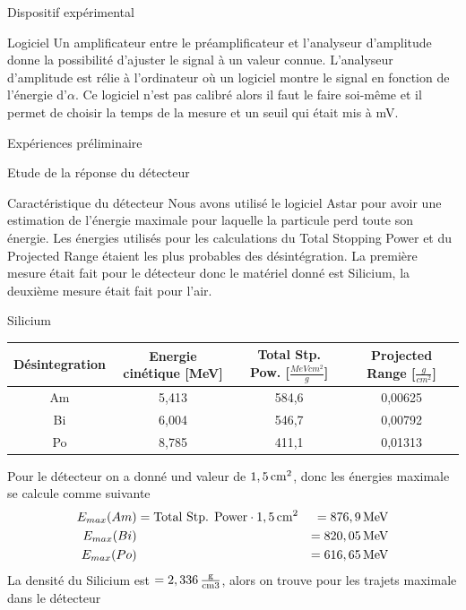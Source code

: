 \documentclass[a4paper,11pt]{scrartcl}
\begin{document}
\begin{section}{Dispositif expérimental}
  \begin{subsection}{Logiciel}
   Un amplificateur entre le préamplificateur et l'analyseur d'amplitude donne la possibilité d'ajuster le signal à un valeur connue. L'analyseur d'amplitude est rélie à l'ordinateur où un logiciel montre le signal en fonction de l'énergie d'$\alpha$. Ce logiciel n'est pas calibré alors il faut le faire soi-même et il permet de choisir la temps de la mesure et un seuil qui était mis à \unit[200]{mV}.
  \end{subsection}
 \end{section}
  
 \begin{section}{Expériences préliminaire}
  \begin{subsection}{Etude de la réponse du détecteur}
   \begin{subsubsection}{Caractéristique du détecteur}
   Nous avons utilisé le logiciel \flqq Astar \frqq \. \cite{astar} pour avoir une estimation de l'énergie maximale pour laquelle la particule perd toute son énergie.  Les énergies utilisés pour les calculations du Total Stopping Power et du Projected Range étaient les plus probables des désintégration. La première mesure était fait pour le détecteur donc le matériel donné est Silicium, la deuxième mesure était fait pour l'air.
   \begin{paragraph}{Silicium}
    \begin{center}
     \begin{tabular}{c|c|c|c}
      Désintegration&	Energie cinétique [MeV] & Total Stp. Pow. [$\frac{MeV cm^2}{g}$]  & Projected Range [$\frac{g}{cm^2}$] \\ \hline
      Am 	&5,413 & 584,6 & 0,00625 \\ 
      Bi	&6,004 & 546,7 & 0,00792 \\ 
      Po	&8,785 & 411,1 & 0,01313 \\ 
     \end{tabular}
    \end{center}
    Pour le détecteur on a donné und valeur de $\unit[1,5]{cm^2}$, donc les énergies maximale se calcule comme suivante 
    \begin{eqnarray*}
     E_{max}(Am)&=\text{Total Stp. Power}\cdot \unit[1,5]{cm^2}&=\unit[876,9]{MeV}\\
     E_{max}(Bi)&&=\unit[820,05]{MeV}\\
     E_{max}(Po)&&=\unit[616,65]{MeV}
    \end{eqnarray*}
    La densité du Silicium est $\rho=\unit[2,336]{\frac{g}{cm3}}$, alors on trouve pour les trajets maximale dans le détecteur

\end{paragraph}
\end{subsubsection}
\end{subsection}
\end{section}
\end{document}
